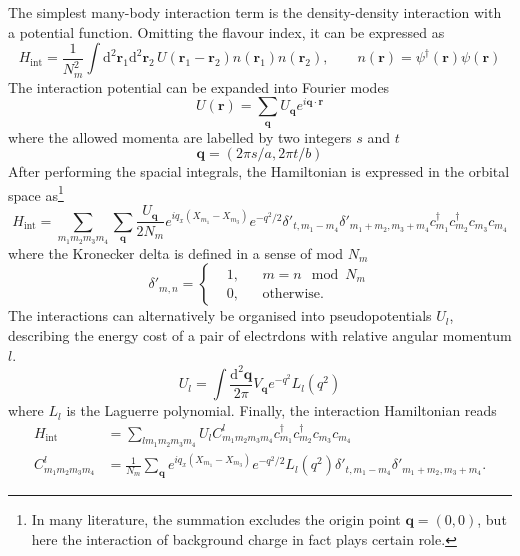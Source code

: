 \documentclass{timesjhep}
\begin{document}
The simplest many-body interaction term is the density-density interaction with a potential function. Omitting the flavour index, it can be expressed as
\begin{equation}
    H_\mathrm{int}=\frac{1}{N_m^2}\int\mathrm{d}^2\mathbf{r}_1\mathrm{d}^2\mathbf{r}_2\,U(\mathbf{r}_1-\mathbf{r}_2)n(\mathbf{r}_1)n(\mathbf{r}_2),\qquad n(\mathbf{r})=\psi^\dagger(\mathbf{r})\psi(\mathbf{r})
\end{equation}
The interaction potential can be expanded into Fourier modes 
\begin{equation}
    U(\mathbf{r})=\sum_\mathbf{q}U_\mathbf{q}e^{i\mathbf{q}\cdot\mathbf{r}}
\end{equation}
where the allowed momenta are labelled by two integers $s$ and $t$
\begin{equation}
    \mathbf{q}=(2\pi s/a,2\pi t/b)
\end{equation}
After performing the spacial integrals, the Hamiltonian is expressed in the orbital space as\footnote{In many literature, the summation excludes the origin point $\mathbf{q}=(0,0)$, but here the interaction of background charge in fact plays certain role.}
\begin{equation}
    H_\mathrm{int}=\sum_{m_1m_2m_3m_4}\sum_\mathbf{q}\frac{U_\mathbf{q}}{2N_m}e^{iq_x(X_{m_1}-X_{m_3})}e^{-q^2/2}\delta'_{t,m_1-m_4}\delta'_{m_1+m_2,m_3+m_4}c^\dagger_{m_1}c^\dagger_{m_2}c_{m_3}c_{m_4}
\end{equation}
where the Kronecker delta is defined in a sense of mod $N_m$
\begin{equation*}
    \delta'_{m,n}=\left\{\begin{aligned}
        &1,&&m=n\mod N_m\\
        &0,&&\textrm{otherwise.}
    \end{aligned}\right.
\end{equation*}
The interactions can alternatively be organised into pseudopotentials $U_l$, describing the energy cost of a pair of electrdons with relative angular momentum $l$.
\begin{equation}
    U_l=\int\frac{\mathrm{d}^2\mathbf{q}}{2\pi}V_\mathbf{q}e^{-q^2}L_l(q^2)
\end{equation}
where $L_l$ is the Laguerre polynomial. Finally, the interaction Hamiltonian reads
\begin{align}
    H_\mathrm{int}&=\sum_{lm_1m_2m_3m_4}U_lC_{m_1m_2m_3m_4}^l c^\dagger_{m_1}c^\dagger_{m_2}c_{m_3}c_{m_4}\nonumber\\
    C_{m_1m_2m_3m_4}^l&=\frac{1}{N_m}\sum_\textbf{q}e^{iq_x(X_{m_1}-X_{m_3})}e^{-q^2/2}L_l(q^2)\delta'_{t,m_1-m_4}\delta'_{m_1+m_2,m_3+m_4}.
\end{align}
\end{document}
